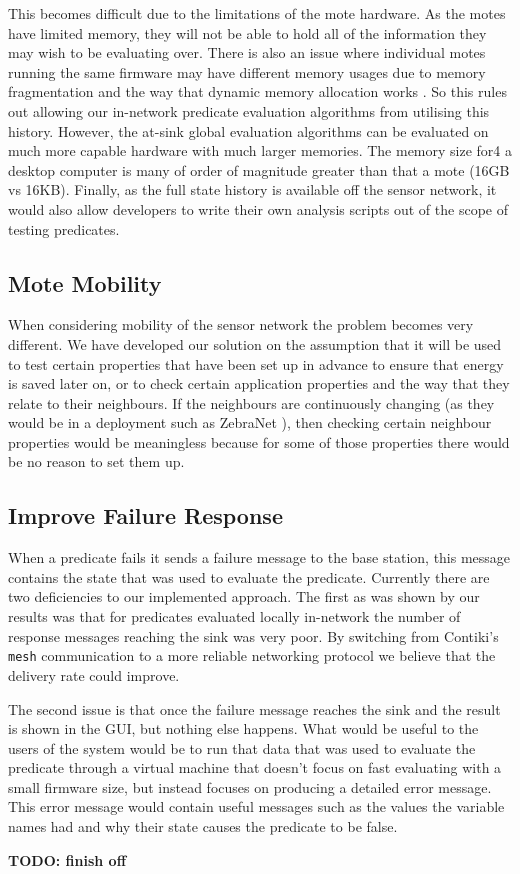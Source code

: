 This becomes difficult due to the limitations of the mote hardware. As the motes have limited memory, they will not be able to hold all of the information they may wish to be evaluating over. There is also an issue where individual motes running the same firmware may have different memory usages due to memory fragmentation and the way that dynamic memory allocation works \cite{?}. So this rules out allowing our in-network predicate evaluation algorithms from utilising this history. However, the at-sink global evaluation algorithms can be evaluated on much more capable hardware with much larger memories. The memory size for4 a desktop computer is many of order of magnitude greater than that a mote (16GB vs 16KB). Finally, as the full state history is available off the sensor network, it would also allow developers to write their own analysis scripts out of the scope of testing predicates.


\subsection{Mote Mobility}

When considering mobility of the sensor network the problem becomes very different. We have developed our solution on the assumption that it will be used to test certain properties that have been set up in advance to ensure that energy is saved later on, or to check certain application properties and the way that they relate to their neighbours. If the neighbours are continuously changing (as they would be in a deployment such as ZebraNet \cite{Juang:2002:ECW:635508.605408}), then checking certain neighbour properties would be meaningless because for some of those properties there would be no reason to set them up.

\subsection{Improve Failure Response}

When a predicate fails it sends a failure message to the base station, this message contains the state that was used to evaluate the predicate. Currently there are two deficiencies to our implemented approach. The first as was shown by our results was that for predicates evaluated locally in-network the number of response messages reaching the sink was very poor. By switching from Contiki's \verb|mesh| communication to a more reliable networking protocol we believe that the delivery rate could improve.

The second issue is that once the failure message reaches the sink and the result is shown in the GUI, but nothing else happens. What would be useful to the users of the system would be to run that data that was used to evaluate the predicate through a virtual machine that doesn't focus on fast evaluating with a small firmware size, but instead focuses on producing a detailed error message. This error message would contain useful messages such as the values the variable names had and why their state causes the predicate to be false.

\textbf{TODO: finish off}
